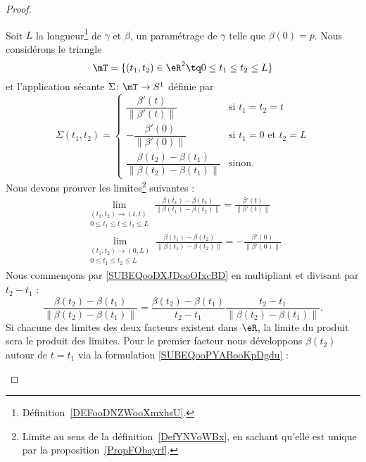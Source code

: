 \begin{proof}
\begin{subproof}
		Soit \( L\) la longueur\footnote{Définition~\ref{DEFooDNZWooXmxhsU}.} de \( \gamma\) et \( \beta\), un paramétrage de \( \gamma\) telle que \( \beta(0)=p\). Nous considérons le triangle
		\begin{equation}
			\mT=\{ (t_1,t_2)\in \eR^2\tq 0\leq t_1\leq t_2\leq L \}
		\end{equation}
		et l'application sécante \( \Sigma\colon \mT\to S^1\) définie par
		\begin{equation}
			\Sigma(t_1,t_2)=\begin{cases}
				\dfrac{ \beta'(t) }{ \| \beta'(t) \| }                         & \text{si } t_1=t_2=t              \\
				-\dfrac{ \beta'(0) }{ \| \beta'(0) \| }                        & \text{si } t_1=0\text{ et } t_2=L \\
				\dfrac{ \beta(t_2)-\beta(t_1) }{ \| \beta(t_2)-\beta(t_1) \| } & \text{sinon}.
			\end{cases}
		\end{equation}
		Nous devons prouver les limites\footnote{Limite au sens de la définition~\ref{DefYNVoWBx}, en sachant qu'elle est unique par la proposition~\ref{PropFObayrf}.} suivantes :
		\begin{subequations}
			\begin{align}
				\lim_{\substack{(t_1,t_2)\to (t,t) \\0\leq t_1\leq t\leq t_2\leq L}}\frac{ \beta(t_1)-\beta(t_2) }{ \| \beta(t_1)-\beta(t_2) \| }=\frac{ \beta'(t) }{ \| \beta'(t) \| }      \label{SUBEQooDXJDooOIxcBD}  \\
				\lim_{\substack{(t_1,t_2)\to (0,L) \\0\leq t_1\leq t_2\leq L}}\frac{ \beta(t_1)-\beta(t_2) }{ \| \beta(t_1)-\beta(t_2) \| }=-\frac{ \beta'(0) }{ \| \beta'(0) \| }        \label{SUBEQooOXGSooXHEHHh}
			\end{align}
		\end{subequations}
		Nous commençons par \eqref{SUBEQooDXJDooOIxcBD} en multipliant et divisant par \( t_2-t_1\) :
		\begin{equation}
			\frac{ \beta(t_2)-\beta(t_1) }{ \|  \beta(t_2)-\beta(t_1)  \| }=\frac{  \beta(t_2)-\beta(t_1)  }{ t_2-t_1 }\frac{ t_2-t_1 }{ \|  \beta(t_2)-\beta(t_1)  \| }.
		\end{equation}
		Si chacune des limites des deux facteurs existent dans \( \eR\), la limite du produit sera le produit des limites. Pour le premier facteur nous développons \( \beta(t_2)\) autour de \( t=t_1\) via la formulation \eqref{SUBEQooPYABooKpDgdu} :

\end{subproof}
\end{proof}
